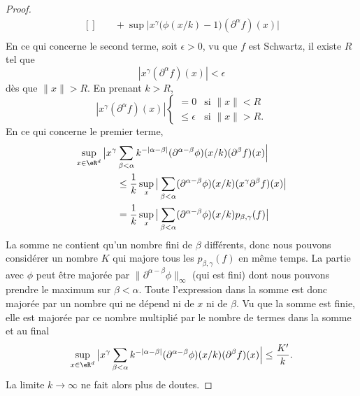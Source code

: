 \begin{proof}
\begin{equation}
\begin{aligned}[]
        &\quad+\sup \big| x^{\gamma}\big( \phi(x/k)-1 \big)(\partial^{\alpha}f)(x) \big|\\
        \end{aligned}
    \end{equation}
    En ce qui concerne le second terme, soit \( \epsilon>0\), vu que \( f\) est Schwartz, il existe \( R\) tel que
    \begin{equation}
        | x^{\gamma}(\partial^{\alpha}f)(x) |<\epsilon
    \end{equation}
    dès que \( \| x \|>R\). En prenant \( k>R\),
    \begin{equation}
        | x^{\gamma}(\partial^{\alpha}f)(x) |\begin{cases}
            =0    &   \text{si } \| x \|<R\\
            \leq \epsilon    &    \text{si } \| x \|>R\text{.}
        \end{cases}
    \end{equation}
    En ce qui concerne le premier terme,
    \begin{subequations}
        \begin{align}
            \sup_{x\in \eR^d}\big| x^{\gamma}&\sum_{\beta<\alpha}k^{-|\alpha-\beta |}(\partial^{\alpha-\beta}\phi)(x/k)(\partial^{\beta}f)(x) \Big|\\
            &\leq \frac{1}{ k }\sup_{x}\big| \sum_{\beta<\alpha}(\partial^{\alpha-\beta}\phi)(x/k)(x^{\gamma}\partial^{\beta}f)(x) \big|\\
            &= \frac{1}{ k }\sup_{x}\big| \sum_{\beta<\alpha}(\partial^{\alpha-\beta}\phi)(x/k)  p_{\beta,\gamma}(f)   \big|
        \end{align}
    \end{subequations}
    La somme ne contient qu'un nombre fini de \( \beta\) différents, donc nous pouvons considérer un nombre \( K\) qui majore tous les \( p_{\beta,\gamma}(f)\) en même temps. La partie avec \( \phi\) peut être majorée par \( \| \partial^{\alpha-\beta}\phi \|_{\infty}\) (qui est fini) dont nous pouvons prendre le maximum sur \(\beta<\alpha\). Toute l'expression dans la somme est donc majorée par un nombre qui ne dépend ni de \( x\) ni de \( \beta\). Vu que la somme est finie, elle est majorée par ce nombre multiplié par le nombre de termes dans la somme et au final
    \begin{equation}
        \sup_{x\in \eR^d}\big| x^{\gamma}\sum_{\beta<\alpha}k^{-|\alpha-\beta |}(\partial^{\alpha-\beta}\phi)(x/k)(\partial^{\beta}f)(x) \Big|\leq \frac{ K' }{ k }.
    \end{equation}
    La limite \( k\to \infty\) ne fait alors plus de doutes.
\end{proof}

